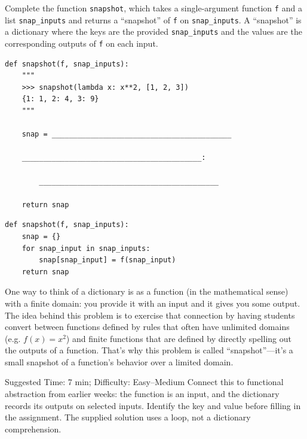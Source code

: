 \begin{blocksection}
\question Complete the function \lstinline{snapshot}, which takes a single-argument function \lstinline{f} and a list \lstinline{snap_inputs} and returns a ``snapshot'' of \lstinline{f} on \lstinline{snap_inputs}. A ``snapshot'' is a dictionary where the keys are the provided \lstinline{snap_inputs} and the values are the corresponding outputs of \lstinline{f} on each input.

\begin{lstlisting}
def snapshot(f, snap_inputs):
    """
    >>> snapshot(lambda x: x**2, [1, 2, 3])
    {1: 1, 2: 4, 3: 9}
    """

    snap = __________________________________________

    __________________________________________:

        __________________________________________
        
    return snap
\end{lstlisting}

\begin{solution}
\begin{lstlisting}
def snapshot(f, snap_inputs):
    snap = {}
    for snap_input in snap_inputs:
        snap[snap_input] = f(snap_input)
    return snap
\end{lstlisting}
\end{solution}
\end{blocksection}

\begin{questionmeta}
One way to think of a dictionary is as a function (in the mathematical sense) with a finite domain: you provide it with an input and it gives you some output. The idea behind this problem is to exercise that connection by having students convert between functions defined by rules that often have unlimited domains (e.g. $f(x) = x^2$) and finite functions that are defined by directly spelling out the outputs of a function. That's why this problem is called ``snapshot''---it's a small snapshot of a function's behavior over a limited domain. 
\end{questionmeta}

\begin{questionmeta}
    Suggested Time: 7 min; Difficulty: Easy--Medium
    Connect this to functional abstraction from earlier weeks: the function is an input, and the dictionary records its outputs on selected inputs. Identify the key and value before filling in the assignment. The supplied solution uses a loop, not a dictionary comprehension.
\end{questionmeta}
